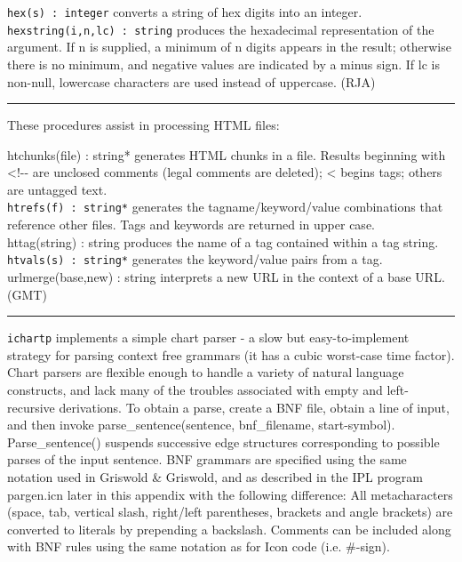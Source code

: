 \texttt{hex(s) : integer} converts a string of hex digits into an
integer.\\
\texttt{hexstring(i,n,lc) : string} produces the
hexadecimal representation of the argument. If n is
supplied, a minimum of n digits appears in the result; otherwise there
is no minimum, and negative values are indicated by a minus sign. If lc
is non-null, lowercase characters are used instead of uppercase. (RJA)

\vspace{0.25cm}\hrule{}

These procedures assist in processing HTML files:

\textsf{htchunks(file) : string*} generates HTML chunks in a
file. Results beginning with {\textless}!-{}- are unclosed comments
(legal comments are deleted); {\textless} begins tags; others are
untagged text.\\
\texttt{htrefs(f) : string*} generates the tagname/keyword/value
combinations that reference other files. Tags and
keywords are returned in upper case.\\
\textsf{httag(string) : string} produces the name of a tag contained
within a tag string.\\
\texttt{htvals(s) : string*} generates the keyword/value pairs from a
tag.\\
\textsf{urlmerge(base,new) : string} interprets a new URL in the context
of a base URL. (GMT)

\vspace{0.25cm}\hrule{}

\texttt{ichartp} implements a simple chart
parser - a slow but easy-to-implement strategy for parsing
context free grammars (it has a cubic worst-case time factor). Chart
parsers are flexible enough to handle a variety of natural language
constructs, and lack many of the troubles associated with empty and
left-recursive derivations. To obtain a parse, create a BNF
file, obtain a line of input, and then invoke parse\_sentence(sentence,
bnf\_filename, start-symbol). Parse\_sentence() suspends successive
edge structures corresponding to possible parses of the input sentence.
BNF grammars are specified using the same notation used in Griswold \&
Griswold, and as described in the IPL program
{\textquotedbl}pargen.icn{\textquotedbl} later in this appendix with
the following difference: All metacharacters (space, tab, vertical
slash, right/left parentheses, brackets and angle brackets) are
converted to literals by prepending a backslash. Comments can be
included along with BNF rules using the same notation as for Icon code
(i.e. \#-sign).

